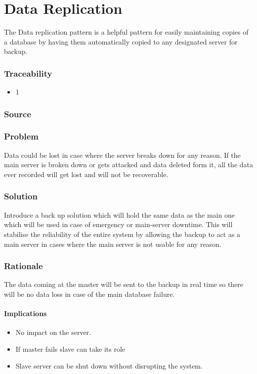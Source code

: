 
\section{Data Replication}

	The Data replication pattern is a helpful pattern for easily maintaining copies of a database by having them automatically copied to any designated server for backup.  

	\subsubsection{Traceability} 
		\begin{itemize}
			\item 1
		\end{itemize}

	\subsubsection{Source} \cite{book:design-patterns}

	\subsubsection{Problem}

	Data could be lost in case where the server breaks down for any reason. If the main server is broken down or gets attacked and data deleted form it, all the data ever recorded will get lost and will not be recoverable. 

	\subsubsection{Solution} 

	Introduce a back up solution which will hold the same data as the main one which will be used in case of emergency or main-server downtime. This will stabilise the reliability of the entire system by allowing the backup to act as a main server in cases where the main server is not usable for any reason.

	\subsubsection{Rationale}
	The data coming at the master will be sent to the backup in real time so there will be no data loss in case of the main database failure.

\paragraph{Implications}
\begin{itemize}
	\item No impact on the server.
	\item If master fails slave can take its role
	\item Slave server can be shut down without disrupting the system.
\end{itemize}
